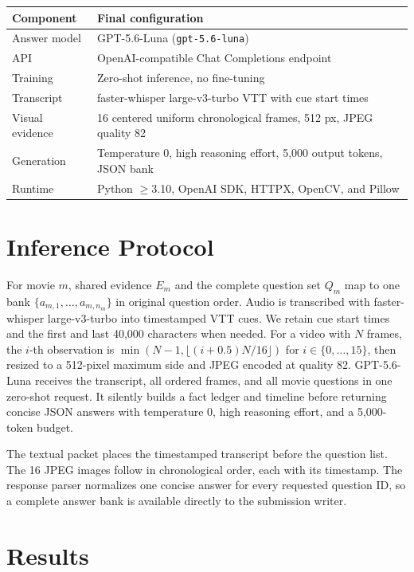 \documentclass[runningheads]{llncs}
\begin{document}
\begin{center}
\small
\begin{tabular}{L{.20\linewidth}L{.67\linewidth}}
\toprule
Component & Final configuration \\
\midrule
Answer model & GPT-5.6-Luna (\texttt{gpt-5.6-luna}) \\
API & OpenAI-compatible Chat Completions endpoint \\
Training & Zero-shot inference, no fine-tuning \\
Transcript & faster-whisper large-v3-turbo VTT with cue start times \\
Visual evidence & 16 centered uniform chronological frames, 512 px, JPEG quality 82 \\
Generation & Temperature 0, high reasoning effort, 5,000 output tokens, JSON bank \\
Runtime & Python $\geq$3.10, OpenAI SDK, HTTPX, OpenCV, and Pillow \\
\bottomrule
\end{tabular}
\end{center}

\section{Inference Protocol}

For movie $m$, shared evidence $E_m$ and the complete question set $Q_m$ map to
one bank $\{a_{m,1},\ldots,a_{m,n_m}\}$ in original question order. Audio is
transcribed with faster-whisper large-v3-turbo into timestamped VTT cues. We
retain cue start times and the first and last 40,000 characters when needed.
For a video with $N$ frames, the $i$-th observation is
$\min(N-1,\lfloor(i+0.5)N/16\rfloor)$ for $i\in\{0,\ldots,15\}$, then resized
to a 512-pixel maximum side and JPEG encoded at quality 82. GPT-5.6-Luna
receives the transcript, all ordered frames, and all movie questions in one
zero-shot request. It silently builds a fact ledger and timeline before
returning concise JSON answers with temperature 0, high reasoning effort, and a
5,000-token budget.

The textual packet places the timestamped transcript before the question list.
The 16 JPEG images follow in chronological order, each with its timestamp. The
response parser normalizes one concise answer for every requested question ID,
so a complete answer bank is available directly to the submission writer.

\section{Results}
\end{document}
